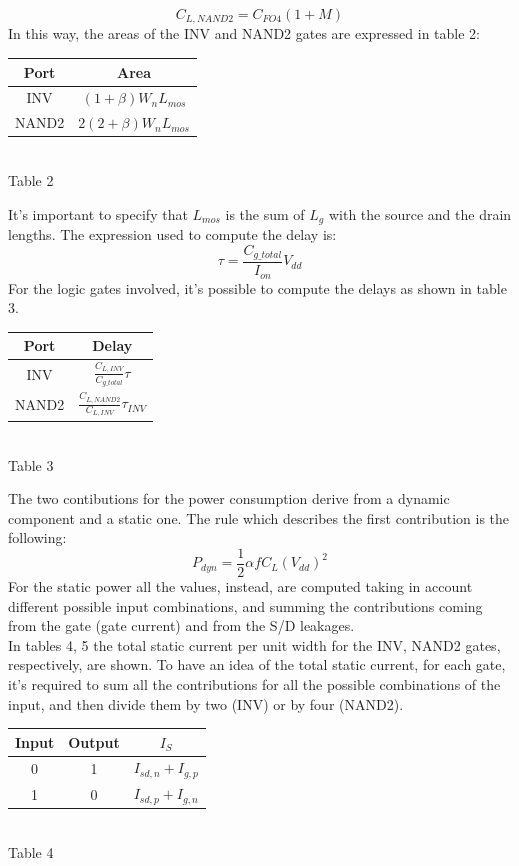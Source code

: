 \documentclass[11pt]{article} %
\begin{document}
$$C_{L,NAND2}= C_{FO4}(1+M)$$
In this way, the areas of the INV and NAND2 gates are expressed in table 2:
\begin{center}
\begin{tabular}{|c|c|}
	\hline 
            Port & Area \\
	\hline          
	INV & $(1 + \beta) W_{n} L_{mos}$ \\ 
	\hline 
	NAND2 & $2(2 + \beta) W_{n} L_{mos}$   \\ 
	\hline 
\end{tabular} \\
\small{Table 2}
\end{center}
It’s important to specify that $L_{mos}$ is the sum of $L_{g}$ with the source and the drain lengths.
\vspace{2em}
The expression used to compute the delay is:
$$\tau = \frac{C_{g\_total}}{I_{on}}V_{dd}$$
For the logic gates involved, it’s possible to compute the delays as shown in table 3.
\begin{center}
\begin{tabular}{|c|c|}
	\hline 
            Port & Delay \\
	\hline          
	INV & $\frac{C_{L,INV}}{C_{g\_total}} \tau $ \\ 
	\hline 
	NAND2 & $\frac{C_{L,NAND2}}{C_{L,INV}} \tau_{INV} $ \\ 
	\hline 
\end{tabular} \\
\small{Table 3}
\end{center}
\vspace{1em}
The two contibutions for the power consumption derive from a dynamic component and a static one. The rule which describes the first contribution is the following:
$$P_{dyn} = \frac{1}{2} \alpha f C_{L} (V_{dd})^{2}$$
For the static power all the values, instead, are computed taking in account different possible input combinations, and summing the contributions coming from the gate (gate current) and from the S/D leakages.\\
In tables 4, 5 the total static current per unit width for the INV, NAND2 gates, respectively, are shown. To have an idea of the total static current, for each gate, it’s required to sum all the contributions for all the possible combinations of the input, and then divide them by two (INV) or by four (NAND2).
\begin{center}
\begin{tabular}{|c|c|c|}
	\hline 
            Input & Output & $I_{S}$\\
	\hline          
	0 & 1 & $I_{sd,n} + I_{g,p}$\\
	\hline 
	1 & 0 & $I_{sd,p} + I_{g,n}$\\ 
	\hline 
\end{tabular} \\
\small{Table 4}
\end{center}
\end{document}
